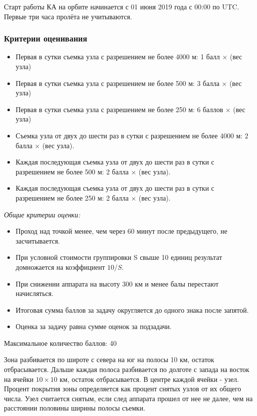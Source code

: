 Старт работы КА на орбите начинается с 01 июня 2019 года с 00:00 по UTC. Первые три часа пролёта не учитываются.

\subsubsection*{Критерии оценивания}

\begin{itemize}
    \item Первая в сутки съемка узла с разрешением не более 4000 м: 1 балл $\times$ (вес узла)
    \item Первая в сутки съемка узла с разрешением не более 500 м: 3 балла $\times$ (вес узла)
    \item Первая в сутки съемка узла с разрешением не более 250 м: 6 баллов $\times$ (вес узла)
    \item Съемка узла от двух до шести раз в сутки с разрешением не более 4000 м: 2 балла $\times$ (вес узла).
    \item Каждая последующая съемка узла от двух до шести раз в сутки с разрешением не более 500 м: 2 балла $\times$ (вес узла).
    \item Каждая последующая съемка узла от двух до шести раз в сутки с разрешением не более 250 м: 2 балла $\times$ (вес узла).
\end{itemize}

\textit{Общие критерии оценки:}

\begin{itemize}
    \item Проход над точкой менее, чем через 60 минут после предыдущего, не засчитывается.
    \item При условной стоимости группировки S свыше 10 единиц результат домножается на коэффициент $10/S$.
    \item При снижении аппарата на высоту 300 км и менее балы перестают начисляться.
    \item Итоговая сумма баллов за задачу округляется до одного знака после запятой.
    \item Оценка за задачу равна сумме оценок за подзадачи.
\end{itemize}

Максимальное количество баллов: 40

Зона разбивается по широте с севера на юг на полосы 10 км, остаток отбрасывается. Дальше каждая полоса разбивается по долготе с запада на восток на ячейки $10 \times 10$ км, остаток отбрасывается. В центре каждой ячейки - узел. Процент покрытия зоны определяется как процент снятых узлов от их общего числа. Узел считается снятым, если след аппарата прошел от нее не далее, чем на расстоянии половины ширины полосы съемки. 


